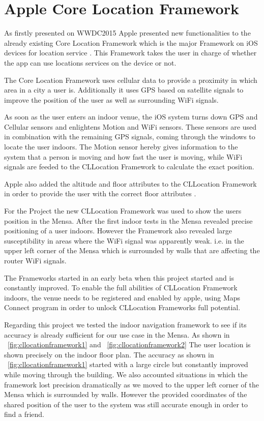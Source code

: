 \vspace{0.5cm}

\section{Apple Core Location Framework}

As firstly presented on WWDC2015 \cite{wwdc15} Apple presented new functionalities to the already existing Core Location Framework which is the major Framework on iOS devices for location service \cite{CLlocation}. This Framework takes the user in charge of whether the app can use locations services on the device or not.

The Core Location Framework uses cellular data to provide a proximity in which area in a city a user is. Additionally it uses GPS based on satellite signals to improve the position of the user as well as surrounding WiFi signals.

As soon as the user enters an indoor venue, the iOS system turns down GPS and Cellular sensors and enlightens Motion and WiFi sensors. These sensors are used in combination with the remaining GPS signals, coming through the windows to locate the user indoors. The Motion sensor hereby gives information to the system that a person is moving and how fast the user is moving, while WiFi signals are feeded to the CLLocation Framework to calculate the exact position.

Apple also added the altitude and floor attributes to the CLLocation Framework in order to provide the user with the correct floor attributes \cite{CLlocation}.

For the Project the new CLLocation Framework was used to show the users position in the Mensa. After the first indoor tests in the Mensa revealed precise positioning of a user indoors. However the Framework also revealed large susceptibility in areas where the WiFi signal was apparently weak. i.e. in the upper left corner of the Mensa which is surrounded by walls that are affecting the router WiFi signals.

The Frameworks started in an early beta when this project started and is constantly improved. To enable the full abilities of CLLocation Framework indoors, the venue needs to be registered and enabled by apple, using Maps Connect program \cite{MapsConnect} in order to unlock CLLocation Frameworks full potential.

Regarding this project we tested the indoor navigation framework to see if its accuracy is already sufficient for our use case in the Mensa. As shown in  ~\ref{fig:cllocationframework1} and ~\ref{fig:cllocationframework2} The user location is shown precisely on the indoor floor plan. The accuracy as shown in ~\ref{fig:cllocationframework1} started with a large circle but constantly improved while moving through the building. We also accounted situations in which the framework lost precision dramatically as we moved to the upper left corner of the Mensa which is surrounded by walls. However the provided coordinates of the shared position of the user to the system was still accurate enough in order to find a friend.

